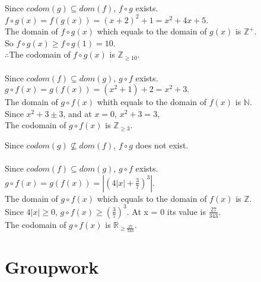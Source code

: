\documentclass[12pt]{exam}
\newcounter{probnumcount}
\begin{document}
\begin{solution}
    \begin{qparts}
        \item
        Since $codom(g) \subseteq dom(f)$, $f \circ g$ exists.\\
        $f \circ g (x) = f(g(x)) = (x+2)^2 + 1 = x^2 + 4x + 5$.\\
        The domain of $f \circ g (x)$ which equals to the domain of $g(x)$ is $\mathbb{Z^+}$.\\
        So $f \circ g (x) \geq f \circ g (1) = 10$.\\
        $\therefore$The codomain of $f \circ g (x)$ is $\mathbb{Z}_{\geq 10}$.\\\\
        Since $codom(f) \subseteq dom(g)$, $g \circ f$ exists.\\
        $g \circ f (x) = g(f(x)) = (x^2 + 1) + 2 = x^2 + 3.$\\
        The domain of $g \circ f (x)$ whith equals to the domain of $f(x)$ is $\mathbb{N}$.\\
        Since $x^2 + 3 \pm 3$, and at $x=0$, $x^2 + 3 = 3$,\\
        The codomain of $g \circ f (x)$ is $\mathbb{Z}_{\geq 3}$.\\
        \item
        Since $codom(g) \not\subseteq dom(f)$, $f \circ g$ does not exist.\\\\
        Since $codom(f) \subseteq dom(g)$, $g \circ f$ exists.\\
        $g \circ f (x) = g(f(x)) = |(4|x| + \frac{3}{7})^{3}| $.\\
        The domain of $g \circ f (x)$ which equals to the domain of $f(x)$ is $\mathbb{Z}$.\\
        Since $4|x| \geq 0$, $g \circ f (x) \geq (\frac{3}{7})^3$. At x = 0 its value is $\frac{27}{343}$.\\
        The codomain of $g \circ f (x)$ is $\mathbb{R}_{\geq \frac{27}{343}}$.\\

    \end{qparts}

\end{solution}

\pagebreak
\setcounter{probnumcount}{1}
\section*{Groupwork}
\end{document}
